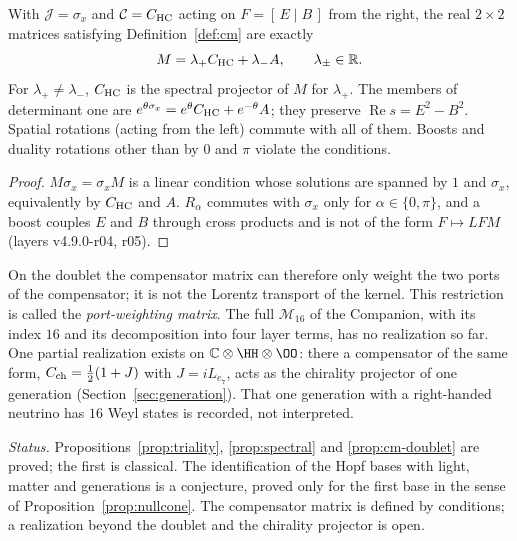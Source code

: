 \begin{proposition}\label{prop:cm-doublet}
With \(\mathcal J=\sigma_x\) and \(\mathcal C=C_{\rm HC}\) acting on \(F=[\,E\mid B\,]\) from the right, the real \(2\times2\) matrices
satisfying Definition~\ref{def:cm} are exactly
\[
M=\lambda_+C_{\rm HC}+\lambda_-A,\qquad \lambda_\pm\in\mathbb R .
\]
For \(\lambda_+\neq\lambda_-\), \(C_{\rm HC}\) is the spectral projector of \(M\) for \(\lambda_+\).  The members of determinant one are
\(e^{\theta\sigma_x}=e^{\theta}C_{\rm HC}+e^{-\theta}A\); they preserve \(\operatorname{Re}s=E^2-B^2\).  Spatial rotations (acting from the
left) commute with all of them.  Boosts and duality rotations other than by \(0\) and \(\pi\) violate the conditions.
\end{proposition}

\begin{proof}
\(M\sigma_x=\sigma_xM\) is a linear condition whose solutions are spanned by \(1\) and \(\sigma_x\), equivalently by
\(C_{\rm HC}\) and \(A\).  \(R_\alpha\) commutes with \(\sigma_x\) only for \(\alpha\in\{0,\pi\}\), and a boost couples \(E\) and \(B\)
through cross products and is not of the form \(F\mapsto LFM\) (layers v4.9.0-r04, r05).
\end{proof}

On the doublet the compensator matrix can therefore only weight the two ports of the compensator; it is not the Lorentz transport
of the kernel.  This restriction is called the \emph{port-weighting matrix}.  The full \(\mathcal M_{16}\) of the Companion, with
its index \(16\) and its decomposition into four layer terms, has no realization so far.  One partial realization exists on
\(\mathbb C\otimes\HH\otimes\OO\): there a compensator of the same form, \(C_{\rm ch}=\tfrac12(1+J)\) with \(J=iL_{e_7}\), acts as the
chirality projector of one generation (Section~\ref{sec:generation}).  That one generation with a right-handed neutrino has \(16\)
Weyl states is recorded, not interpreted.

\medskip\noindent\emph{Status.}  Propositions~\ref{prop:triality}, \ref{prop:spectral} and \ref{prop:cm-doublet} are proved; the
first is classical.  The identification of the Hopf bases with light, matter and generations is a conjecture, proved only for the
first base in the sense of Proposition~\ref{prop:nullcone}.  The compensator matrix is defined by conditions; a realization beyond
the doublet and the chirality projector is open.
